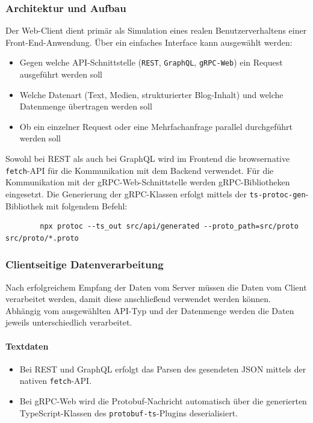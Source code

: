 \begin{enumerate}
	\subsubsection*{Architektur und Aufbau}
	Der Web-Client dient primär als Simulation eines realen Benutzerverhaltens einer Front-End-Anwendung. Über ein einfaches Interface kann ausgewählt werden:
	\begin{itemize}
		\item Gegen welche API-Schnittstelle (\texttt{REST}, \texttt{GraphQL}, \texttt{gRPC-Web}) ein Request ausgeführt werden soll
		\item Welche Datenart (Text, Medien, strukturierter Blog-Inhalt) und welche Datenmenge übertragen werden soll
		\item Ob ein einzelner Request oder eine Mehrfachanfrage parallel durchgeführt werden soll
	\end{itemize}
	
	Sowohl bei REST als auch bei GraphQL wird im Frontend die browsernative \texttt{fetch}-API für die Kommunikation mit dem Backend verwendet.  
	Für die Kommunikation mit der gRPC-Web-Schnittstelle werden gRPC-Bibliotheken eingesetzt. Die Generierung der gRPC-Klassen erfolgt mittels der \texttt{ts-protoc-gen}-Bibliothek mit folgendem Befehl:
	
	\begin{verbatim}
		npx protoc --ts_out src/api/generated --proto_path=src/proto src/proto/*.proto
	\end{verbatim}
	
	\subsubsection*{Clientseitige Datenverarbeitung}
	Nach erfolgreichem Empfang der Daten vom Server müssen die Daten vom Client verarbeitet werden, damit diese anschließend verwendet werden können. Abhängig vom ausgewählten API-Typ und der Datenmenge werden die Daten jeweils unterschiedlich verarbeitet. 
	
	\paragraph{Textdaten}
	\begin{itemize}
		\item Bei REST und GraphQL erfolgt das Parsen des gesendeten JSON mittels der nativen \texttt{fetch}-API.
		\item Bei gRPC-Web wird die Protobuf-Nachricht automatisch über die generierten TypeScript-Klassen des \texttt{protobuf-ts}-Plugins deserialisiert.
	\end{itemize}
	

\end{enumerate}
